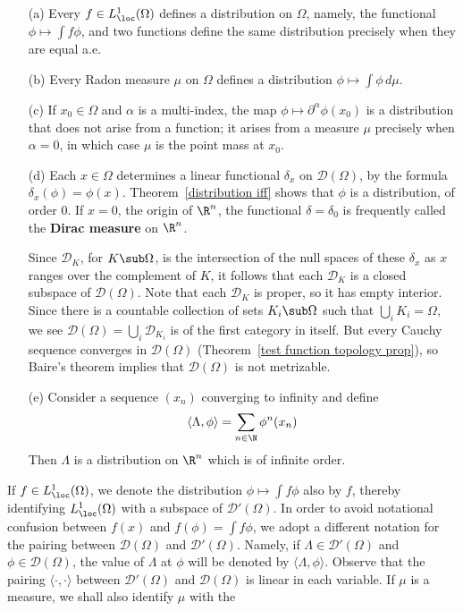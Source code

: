 \begin{example}
\mbox{}
\begin{itemize}
\item[(a)] Every $f\in L^1_{\loc}(\Omega)$ defines a distribution on $\Omega$, namely, the functional $\phi\mapsto\int f\phi$, and two functions define the same distribution precisely when they are equal a.e.
\item[(b)] Every Radon measure $\mu$ on $\Omega$ defines a distribution $\phi\mapsto\int\phi\,d\mu$.
\item[(c)] If $x_0\in\Omega$ and $\alpha$ is a multi-index, the map $\phi\mapsto\partial^\alpha\phi(x_0)$ is a distribution that does not arise from a function; it arises from a measure $\mu$ precisely when $\alpha=0$, in which case $\mu$ is the point mass at $x_0$.
\item[(d)] Each $x\in\Omega$ determines a linear functional $\delta_x$ on $\mathscr{D}(\Omega)$, by the formula $\delta_x(\phi)=\phi(x)$. Theorem~\ref{distribution iff} shows that $\phi$ is a distribution, of order $0$. If $x=0$, the origin of $\R^n$, the functional $\delta=\delta_0$ is frequently called the \textbf{Dirac measure} on $\R^n$.\par
Since $\mathscr{D}_K$, for $K\sub\Omega$, is the intersection of the null spaces of these $\delta_x$ as $x$ ranges over the complement of $K$, it follows that each $\mathscr{D}_K$ is a closed subspace of $\mathscr{D}(\Omega)$. Note that each $\mathscr{D}_K$ is proper, so it has empty interior. Since there is a countable collection of sets $K_i\sub\Omega$ such that $\bigcup_iK_i=\Omega$, we see $\mathscr{D}(\Omega)=\bigcup_i\mathscr{D}_{K_i}$ is of the first category in itself. But every Cauchy sequence converges in $\mathscr{D}(\Omega)$ (Theorem~\ref{test function topology prop}), so Baire's theorem implies that $\mathscr{D}(\Omega)$ is not metrizable.
\item[(e)] Consider a sequence $(x_n)$ converging to infinity and define
\[\langle\Lambda,\phi\rangle=\sum_{n\in\N}\phi^n(x_n)\]
Then $\Lambda$ is a distribution on $\R^n$ which is of infinite order. 
\end{itemize}
\end{example}
If $f\in L^1_{\loc}(\Omega)$, we denote the distribution $\phi\mapsto\int f\phi$ also by $f$, thereby identifying $L^1_{\loc}(\Omega)$ with a subspace of $\mathscr{D}'(\Omega)$. In order to avoid notational confusion between $f(x)$ and $f(\phi)=\int f\phi$, we adopt a different notation for the pairing between $\mathscr{D}(\Omega)$ and $\mathscr{D}'(\Omega)$. Namely, if $\Lambda\in\mathscr{D}'(\Omega)$ and $\phi\in\mathscr{D}(\Omega)$, the value of $\Lambda$ at $\phi$ will be denoted by $\langle\Lambda,\phi\rangle$. Observe that the pairing $\langle\cdot,\cdot\rangle$ between $\mathscr{D}'(\Omega)$ and $\mathscr{D}(\Omega)$ is linear in each variable. If $\mu$ is a measure, we shall also identify $\mu$ with the
